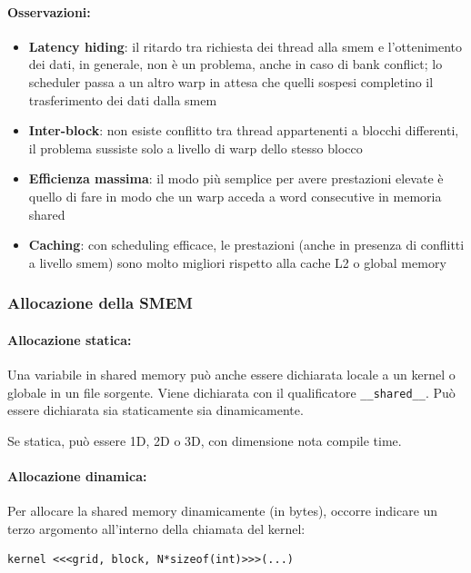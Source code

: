 \paragraph{Osservazioni:}
\begin{itemize}
	\item \textbf{Latency hiding}: il ritardo tra richiesta dei thread alla smem e l'ottenimento dei dati, in generale, non è un problema, anche in caso di bank conflict; lo scheduler passa a un altro warp in attesa che quelli sospesi completino il trasferimento dei dati dalla smem
	
	\item \textbf{Inter-block}: non esiste conflitto tra thread appartenenti a blocchi differenti, il problema sussiste solo a livello di warp dello stesso blocco 
	
	\item \textbf{Efficienza massima}: il modo più semplice per avere prestazioni elevate è quello di fare in modo che un warp acceda a word consecutive in memoria shared
	
	\item \textbf{Caching}: con scheduling efficace, le prestazioni (anche in presenza di conflitti a livello smem) sono molto migliori rispetto alla cache L2 o global memory
\end{itemize}

\subsubsection{Allocazione della SMEM}

\paragraph{Allocazione statica:} Una variabile in shared memory può anche essere dichiarata locale a un kernel o globale in un file sorgente. Viene dichiarata con il qualificatore \texttt{\_\_shared\_\_}. Può essere dichiarata sia staticamente sia dinamicamente. 

Se statica, può essere 1D, 2D o 3D, con dimensione nota compile time.

\paragraph{Allocazione dinamica:} Per allocare la shared memory dinamicamente (in bytes), occorre indicare un terzo argomento all'interno della chiamata del kernel:
\begin{verbatim}
kernel <<<grid, block, N*sizeof(int)>>>(...)
\end{verbatim}

